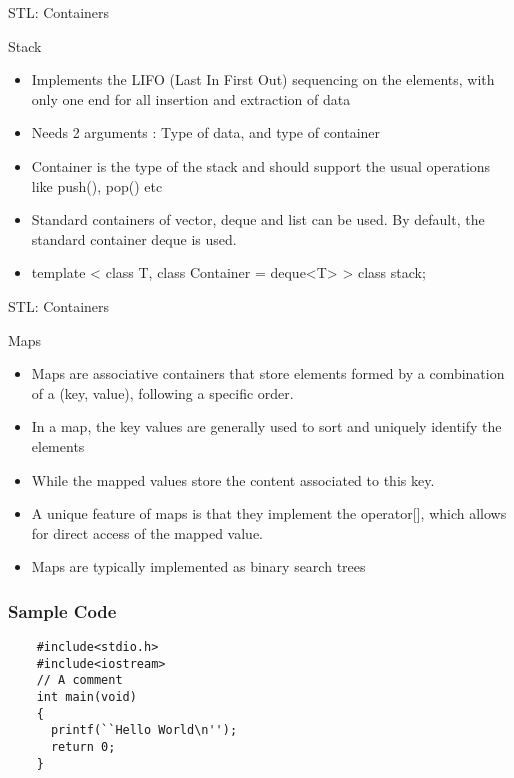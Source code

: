 \documentclass{beamer}
\begin{document}
\begin{frame}[fragile]{STL: Containers}
  \begin{block}{Stack}
    \begin{itemize}
    \item Implements the LIFO (Last In First Out) sequencing on the elements, with only one end for all insertion and extraction of data\pause
    \item Needs 2 arguments : Type of data, and type of container\pause
    \item Container is the type of the stack and should support the usual operations like push(), pop() etc\pause
    \item Standard containers of vector, deque and list can be used. By default, the standard container deque is used.\pause
    \item template < class T, class Container = deque<T> > class stack;
    \end{itemize}
  \end{block}
\end{frame}

\begin{frame}[fragile]{STL: Containers}
  \begin{block}{Maps}
    \begin{itemize}
    \item Maps are associative containers that store elements formed by a combination of a (key, value), following a specific order.\pause
    \item In a map, the key values are generally used to sort and uniquely identify the elements\pause
    \item While the mapped values store the content associated to this key.\pause
    \item A unique feature of maps is that they implement the operator[], which allows for direct access of the mapped value.\pause
    \item Maps are typically implemented as binary search trees
    \end{itemize}
  \end{block}
\end{frame}

\begin{frame}[fragile]
\frametitle{Sample Code}
\begin{lstlisting}
    #include<stdio.h>
    #include<iostream>
    // A comment
    int main(void)
    {
      printf(``Hello World\n'');
      return 0;
    }
\end{lstlisting}
\end{frame}
\end{document}
